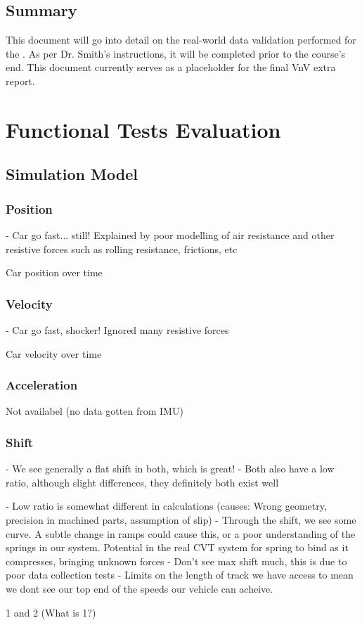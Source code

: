 \documentclass[12pt, titlepage]{article}
\begin{document}
\subsection{Summary}

\noindent This document will go into detail on the real-world data validation performed for the \progname{}. As per Dr. Smith's instructions, it will be completed prior to the course's end. This document currently serves as a placeholder for the final VnV extra report.

\section{Functional Tests Evaluation}

\subsection{Simulation Model}

\subsubsection{Position}

- Car go fast... still! Explained by poor modelling of air resistance and other resistive forces such as rolling resistance, frictions, etc

Car position over time

\subsubsection{Velocity}

- Car go fast, shocker! Ignored many resistive forces

Car velocity over time

\subsubsection{Acceleration}

Not availabel (no data gotten from IMU)

\subsubsection{Shift}

- We see generally a flat shift in both, which is great!
- Both also have a low ratio, although slight differences, they definitely both exist well

- Low ratio is somewhat different in calculations (causes: Wrong geometry, precision in machined parts, assumption of slip)
- Through the shift, we see some curve. A subtle change in ramps could cause this, or a poor understanding of the springs in our system. Potential in the real CVT system for spring to bind as it compresses, bringing unknown forces
- Don't see max shift much, this is due to poor data collection tests - Limits on the length of track we have access to mean we dont see our top end of the speeds our vehicle can acheive.


1 and 2 (What is 1?)
\end{document}
